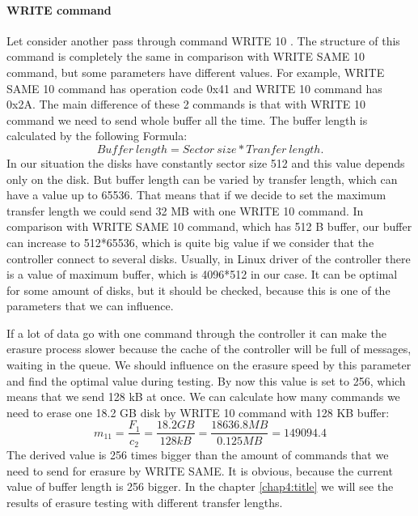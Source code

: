 \paragraph{WRITE command}
Let consider another pass through command WRITE 10 \cite{scsi3_bc}. The structure of this command is completely the same in comparison with WRITE SAME 10 command, but some parameters have different values. For example, WRITE SAME 10 command has operation code 0x41 and WRITE 10 command has 0x2A. The main difference of these 2 commands is that with WRITE 10 command we need to send whole buffer all the time. The buffer length is calculated by the following Formula:
\begin{equation}
	Buffer~length = Sector~size * Tranfer~length.
\end{equation}
In our situation the disks have constantly sector size 512 and this value depends only on the disk. But buffer length can be varied by transfer length, which can have a value up to 65536. That means that if we decide to set the maximum transfer length we could send 32 MB with one WRITE 10 command. In comparison with WRITE SAME 10 command, which has 512 B buffer, our buffer can increase to 512*65536, which is quite big value if we consider that the controller connect to several disks. Usually, in Linux driver of the controller there is a value of maximum buffer, which is 4096*512 in our case. It can be optimal for some amount of disks, but it should be checked, because this is one of the parameters that we can influence.

If a lot of data go with one command through the controller it can make the erasure process slower because the cache of the controller will be full of messages, waiting in the queue. We should influence on the erasure speed by this parameter and find the optimal value during testing. By now this value is set to 256, which means that we send 128 kB at once. We can calculate how many commands we need to erase one 18.2 GB disk by WRITE 10 command with 128 KB buffer:
\begin{equation}
	m_{11}=\frac{F_{1}}{c_{2}}=\frac{18.2GB}{128kB}=\frac{18636.8MB}{0.125MB}=149094.4
\end{equation}
The derived value is 256 times bigger than the amount of commands that we need to send for erasure by WRITE SAME. It is obvious, because the current value of buffer length is 256 bigger. In the chapter  \ref{chap4:title} we will see the results of erasure testing with different transfer lengths.














